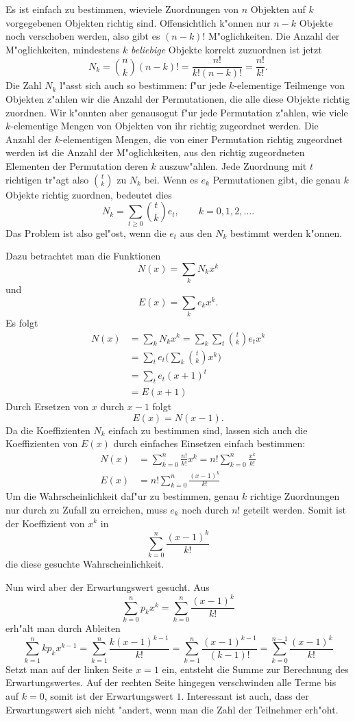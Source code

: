 Es ist einfach zu bestimmen, wieviele Zuordnungen von $n$ Objekten auf $k$
vorgegebenen Objekten richtig sind. Offensichtlich k"onnen nur $n-k$ Objekte
noch verschoben werden, also gibt es $(n-k)!$ M"oglichkeiten.
Die Anzahl der M"oglichkeiten, mindestens $k$ {\it beliebige} Objekte korrekt
zuzuordnen ist jetzt
$$N_k=\binom{n}{k}(n-k)!=\frac{n!}{k!(n-k)!}=\frac{n!}{k!}.$$
Die Zahl $N_k$ l"asst sich auch so bestimmen: f"ur jede $k$-elementige
Teilmenge von Objekten z"ahlen wir die Anzahl der Permutationen, die 
alle diese Objekte richtig zuordnen. Wir k"onnten aber genausogut
f"ur jede Permutation z"ahlen, wie viele $k$-elementige Mengen von Objekten
von ihr richtig zugeordnet werden. Die Anzahl der $k$-elementigen Mengen,
die von einer Permutation richtig zugeordnet werden ist die Anzahl der
M"oglichkeiten, aus den richtig zugeordneten Elementen der Permutation
deren $k$ auszuw"ahlen. Jede Zuordnung mit $t$ richtigen tr"agt also
$\binom{t}{k}$ zu $N_k$ bei. Wenn es $e_k$ Permutationen gibt,
die genau $k$ Objekte richtig zuordnen, bedeutet dies
$$N_k=\sum_{t\ge 0}\binom{t}{k}e_t,\qquad k=0,1,2,\dots.$$
Das Problem ist also gel"ost, wenn die $e_t$ aus den $N_k$ bestimmt werden k"onnen.

Dazu betrachtet man die Funktionen
$$N(x)=\sum_{k}N_kx^k$$
und 
$$E(x)=\sum_{k}e_kx^k.$$
Es folgt
\begin{align*}
N(x)&=\sum_kN_kx^k=\sum_k\sum_t\binom{t}{k}e_tx^k\\
&=\sum_te_t\biggl(\sum_k\binom{t}{k}x^k\biggr)\\
&=\sum_te_t(x+1)^t\\
&=E(x+1)
\end{align*}
Durch Ersetzen von $x$ durch $x-1$ folgt
$$E(x)=N(x-1).$$
Da die Koeffizienten $N_k$ einfach zu bestimmen sind, lassen sich auch
die Koeffizienten von $E(x)$ durch einfaches Einsetzen einfach
bestimmen:
\begin{align*}
N(x)&=\sum_{k=0}^n\frac{n!}{k!}x^k=n!\sum_{k=0}^n\frac{x^k}{k!}\\
E(x)&=n!\sum_{k=0}^n\frac{(x-1)^k}{k!}
\end{align*}
Um die Wahrscheinlichkeit daf"ur zu bestimmen, genau $k$ richtige Zuordnungen nur
durch zu Zufall zu erreichen, muss $e_k$ noch durch $n!$ geteilt werden. Somit
ist der Koeffizient von $x^k$ in
$$\sum_{k=0}^n\frac{(x-1)^k}{k!}$$
die diese gesuchte Wahrscheinlichkeit.

Nun wird aber der Erwartungswert gesucht. Aus
$$\sum_{k=0}^np_kx^k=\sum_{k=0}^n\frac{(x-1)^k}{k!}$$
erh"alt man durch Ableiten
$$
\sum_{k=1}^nkp_kx^{k-1}
=\sum_{k=1}^n\frac{k(x-1)^{k-1}}{k!}
=\sum_{k=1}^n\frac{(x-1)^{k-1}}{(k-1)!}
=\sum_{k=0}^{n-1}\frac{(x-1)^k}{k!}
$$
Setzt man auf der linken Seite $x=1$ ein, entsteht die Summe zur
Berechnung des Erwartungswertes. Auf der rechten Seite hingegen
verschwinden alle Terme bis auf $k=0$, somit ist der Erwartungswert
$1$.
Interessant ist auch, dass der Erwartungswert sich nicht "andert,
wenn man die Zahl der Teilnehmer erh"oht.

